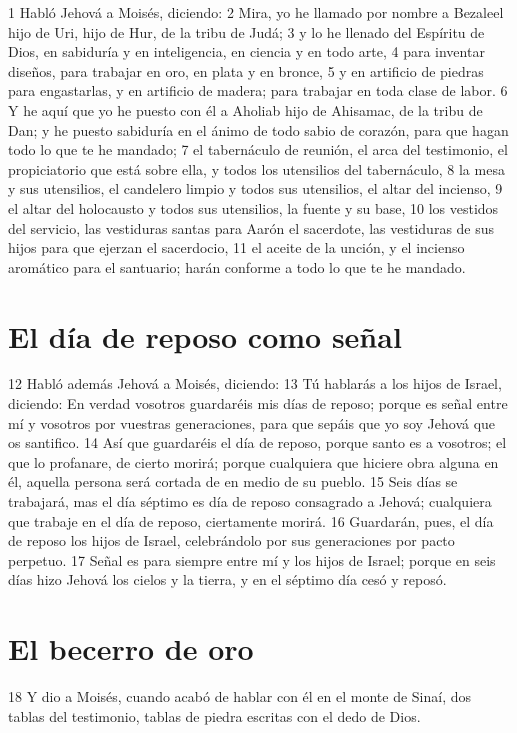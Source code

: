 1 Habló Jehová a Moisés, diciendo:
2 Mira, yo he llamado por nombre a Bezaleel hijo de Uri, hijo de Hur, de la tribu de Judá;
3 y lo he llenado del Espíritu de Dios, en sabiduría y en inteligencia, en ciencia y en todo arte,
4 para inventar diseños, para trabajar en oro, en plata y en bronce,
5 y en artificio de piedras para engastarlas, y en artificio de madera; para trabajar en toda clase de labor.
6 Y he aquí que yo he puesto con él a Aholiab hijo de Ahisamac, de la tribu de Dan; y he puesto sabiduría en el ánimo de todo sabio de corazón, para que hagan todo lo que te he mandado;
7 el tabernáculo de reunión, el arca del testimonio, el propiciatorio que está sobre ella, y todos los utensilios del tabernáculo,
8 la mesa y sus utensilios, el candelero limpio y todos sus utensilios, el altar del incienso,
9 el altar del holocausto y todos sus utensilios, la fuente y su base,
10 los vestidos del servicio, las vestiduras santas para Aarón el sacerdote, las vestiduras de sus hijos para que ejerzan el sacerdocio,
11 el aceite de la unción, y el incienso aromático para el santuario; harán conforme a todo lo que te he mandado.

\section{El día de reposo como señal}

12 Habló además Jehová a Moisés, diciendo:
13 Tú hablarás a los hijos de Israel, diciendo: En verdad vosotros guardaréis mis días de reposo; porque es señal entre mí y vosotros por vuestras generaciones, para que sepáis que yo soy Jehová que os santifico.
14 Así que guardaréis el día de reposo, porque santo es a vosotros; el que lo profanare, de cierto morirá; porque cualquiera que hiciere obra alguna en él, aquella persona será cortada de en medio de su pueblo.
15 Seis días se trabajará, mas el día séptimo es día de reposo consagrado a Jehová; cualquiera que trabaje en el día de reposo, ciertamente morirá.
16 Guardarán, pues, el día de reposo los hijos de Israel, celebrándolo por sus generaciones por pacto perpetuo.
17 Señal es para siempre entre mí y los hijos de Israel; porque en seis días hizo Jehová los cielos y la tierra, y en el séptimo día cesó y reposó.

\section{El becerro de oro}

18 Y dio a Moisés, cuando acabó de hablar con él en el monte de Sinaí, dos tablas del testimonio, tablas de piedra escritas con el dedo de Dios.

